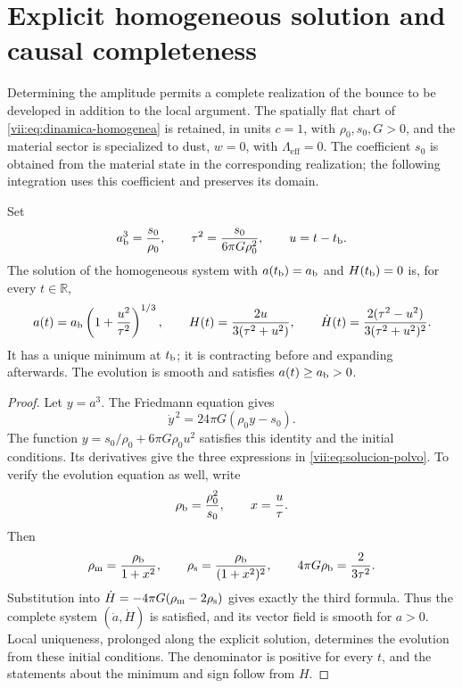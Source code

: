 \section{Explicit homogeneous solution and causal completeness}
\label{vii:sec:solucion-homogenea}
Determining the amplitude permits a complete realization of the bounce
to be developed in addition to the local argument. The spatially flat
chart of \eqref{vii:eq:dinamica-homogenea} is retained, in units
\(c=1\), with \(\rho_0,s_0,G>0\), and the material sector is specialized
to dust, \(w=0\), with \(\Lambda_{\mathrm{eff}}=0\).
The coefficient \(s_0\) is obtained from the material state in the
corresponding realization; the following integration uses this
coefficient and preserves its domain.

\begin{theorem}
\label{vii:thm:rebote-polvo}
Set
\[
 a_{\rm b}^3=\frac{s_0}{\rho_0},\qquad
 \tau^2=\frac{s_0}{6\pi G\rho_0^2},\qquad u=t-t_{\rm b}.
\]
The solution of the homogeneous system with
\(a(t_{\rm b})=a_{\rm b}\) and \(H(t_{\rm b})=0\) is, for every
\(t\in\mathbb R\),
\begin{equation}
 a(t)=a_{\rm b}\left(1+\frac{u^2}{\tau^2}\right)^{1/3},
 \qquad H(t)=\frac{2u}{3(\tau^2+u^2)},\qquad
 \dot H(t)=\frac{2(\tau^2-u^2)}{3(\tau^2+u^2)^2}.
 \label{vii:eq:solucion-polvo}
\end{equation}
It has a unique minimum at \(t_{\rm b}\); it is contracting before
and expanding afterwards. The evolution is smooth and satisfies
\(a(t)\geq a_{\rm b}>0\).
\end{theorem}
\begin{proof}
Let \(y=a^3\). The Friedmann equation gives
\[
 \dot y^{\,2}=24\pi G(\rho_0y-s_0).
\]
The function \(y=s_0/\rho_0+6\pi G\rho_0u^2\) satisfies this
identity and the initial conditions. Its derivatives give the
three expressions in \eqref{vii:eq:solucion-polvo}. To verify the
evolution equation as well, write
\[
 \rho_{\rm b}=\frac{\rho_0^2}{s_0},\qquad
 x=\frac{u}{\tau}.
\]
Then
\[
 \rho_{\rm m}=\frac{\rho_{\rm b}}{1+x^2},\qquad
 \rho_{\rm s}=\frac{\rho_{\rm b}}{(1+x^2)^2},\qquad
 4\pi G\rho_{\rm b}=\frac{2}{3\tau^2}.
\]
Substitution into \(\dot H=-4\pi G(\rho_{\rm m}-2\rho_{\rm s})\)
gives exactly the third formula. Thus the complete system
\((\dot a,\dot H)\) is satisfied, and its vector field is smooth
for \(a>0\). Local uniqueness, prolonged along the explicit
solution, determines the evolution from these initial conditions.
The denominator is positive for every \(t\), and the statements
about the minimum and sign follow from \(H\).
\end{proof}

